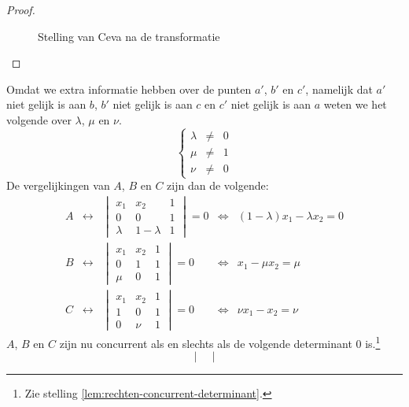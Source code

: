 \documentclass[main.tex]{subfiles}
\begin{document}
\begin{st}
\begin{proof}
\begin{figure}[H]
      \caption{Stelling van Ceva na de transformatie}
      \label{fig:stelling-van-ceva-na}
    \end{figure}
  \end{proof}
  Omdat we extra informatie hebben over de punten $a'$, $b'$ en $c'$, namelijk dat $a'$ niet gelijk is aan $b$, $b'$ niet gelijk is aan $c$ en $c'$ niet gelijk is aan $a$ weten we het volgende over $\lambda$, $\mu$ en $\nu$.
  \[
  \left\{
  \begin{array}{rcl}
    \lambda &\neq & 0\\ 
    \mu &\neq & 1\\
    \nu &\neq & 0
  \end{array}
  \right.
  \]
  De vergelijkingen van $A$, $B$ en $C$ zijn dan de volgende:
  \[
  \begin{array}{rclcl}
  A &\leftrightarrow &
  \begin{vmatrix}
    x_{1} & x_{2} & 1\\
    0 & 0 & 1\\
    \lambda & 1-\lambda & 1
  \end{vmatrix}
  = 0
  &\Leftrightarrow&
  (1-\lambda)x_{1} - \lambda x_{2} = 0
\\
  B &\leftrightarrow &
  \begin{vmatrix}
    x_{1} & x_{2} & 1\\
    0 & 1 & 1\\
    \mu & 0 & 1
  \end{vmatrix}
  = 0
  &\Leftrightarrow&
  x_{1} - \mu x_{2} = \mu
\\
  C &\leftrightarrow &
  \begin{vmatrix}
    x_{1} & x_{2} & 1\\
    1 & 0 & 1\\
    0 & \nu & 1
  \end{vmatrix}
  = 0
  &\Leftrightarrow&
  \nu x_{1} - x_{2} = \nu
  \end{array}
  \]
  $A$, $B$ en $C$ zijn nu concurrent als en slechts als de volgende determinant $0$ is.\footnote{Zie stelling \ref{lem:rechten-concurrent-determinant}.}
  \[
  \begin{vmatrix}

\end{vmatrix}\]
\end{st}
\end{document}
